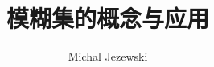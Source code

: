 \documentclass{ctexbook}
\begin{document}
\title{模糊集的概念与应用}
\author{Michal Jezewski }
\maketitle

\tableofcontents


\end{document}
